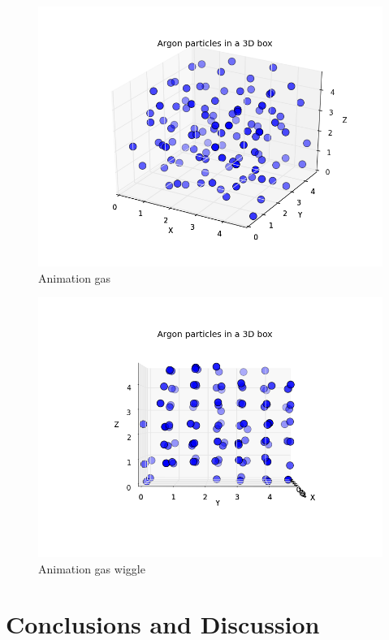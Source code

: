 \documentclass[a4paper,twoside,12pt]{article}
\begin{document}
\begin{figure}
\centering
\includegraphics[scale=0.6]{figures/ani_gas_2.png}
\caption{Animation gas}
\label{fig:Ani_gas}
\end{figure}

\begin{figure}
\centering
\includegraphics[scale=0.6]{figures/ani_wiggle.png}
\caption{Animation gas wiggle}
\label{Animation_gas_wiggle}
\end{figure}
\newpage

\section{Conclusions and Discussion}
\end{document}
